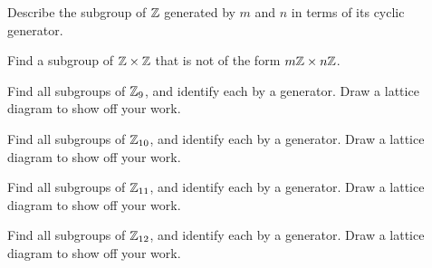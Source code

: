 \documentclass{ximera}
\begin{document}
\begin{exercise}
  Describe the subgroup of $\mathbb Z$ generated by $m$ and $n$ in terms of
  its cyclic generator.
\end{exercise}

\begin{exercise}
  Find a subgroup of $\mathbb Z\times\mathbb Z$ that is not of the form $m\mathbb Z \times
  n\mathbb Z$.
\end{exercise}


\begin{exercise}
  Find all subgroups of $\mathbb Z_9$, and identify each by a generator. Draw
  a lattice diagram to show off your work.
\end{exercise}


\begin{exercise}
  Find all subgroups of $\mathbb Z_{10}$, and identify each by a generator. Draw
  a lattice diagram to show off your work.
\end{exercise}

\begin{exercise}
  Find all subgroups of $\mathbb Z_{11}$, and identify each by a generator. Draw
  a lattice diagram to show off your work.
\end{exercise}

\begin{exercise}
  Find all subgroups of $\mathbb Z_{12}$, and identify each by a generator.  Draw
  a lattice diagram to show off your work.
\end{exercise}

  







  
\end{document}
